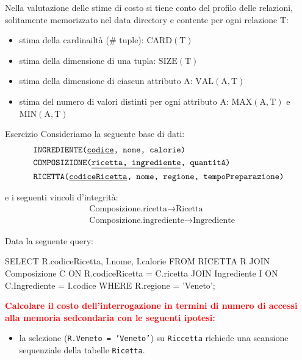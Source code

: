Nella valutazione delle stime di costo si tiene conto del profilo delle relazioni, solitamente memorizzato nel data directory e contente per ogni relazione $\mathrm{T}$:
\begin{itemize}[label=$\circ$, itemsep=\smallskipamount]
    \item stima della cardinailtà (\# tuple): $\mathrm{CARD(T)}$
    \item stima della dimensione di una tupla: $\mathrm{SIZE(T)}$
    \item stima della dimensione di ciascun attributo $\mathrm{A}$: $\mathrm{VAL(A,T)}$
    \item stima del numero di valori distinti per ogni attributo $\mathrm{A}$: $\mathrm{MAX(A,T)}$ e $\mathrm{MIN(A,T)}$
\end{itemize}

\begin{esempiobox}{Esercizio}
    Consideriamo la seguente base di dati:
    \[
        \begin{aligned}
            &\texttt{INGREDIENTE(\underline{codice}, nome, calorie)}\\
            &\texttt{COMPOSIZIONE(\underline{ricetta, ingrediente}, quantità)}\\
            &\texttt{RICETTA(\underline{codiceRicetta}, nome, regione, tempoPreparazione)}
        \end{aligned}
    \]

    e i seguenti vincoli d'integrità:
    \[
        \begin{aligned}
            &\text{Composizione.ricetta} \rightarrow \text{Ricetta}\\
            &\text{Composizione.ingrediente} \rightarrow \text{Ingrediente}
        \end{aligned}
    \]

    Data la seguente query:
\begin{codiceSQL}
SELECT R.codiceRicetta, I.nome, I.calorie
FROM RICETTA R
JOIN Composizione C ON R.codiceRicetta = C.ricetta
JOIN Ingrediente I ON C.Ingrediente = I.codice
    WHERE R.regione = 'Veneto';
\end{codiceSQL}

    \textcolor{red}{\textbf{Calcolare il costo dell'interrogazione in termini di numero di accessi alla memoria sedcondaria con le seguenti ipotesi:}}
    \begin{itemize}[label=$\circ$, itemsep=\smallskipamount]
        \item la selezione (\texttt{R.Veneto = 'Veneto'}) su \texttt{Riccetta} richiede una scansione sequenziale della tabelle \texttt{Ricetta}.
        

\end{itemize}
\end{esempiobox}

